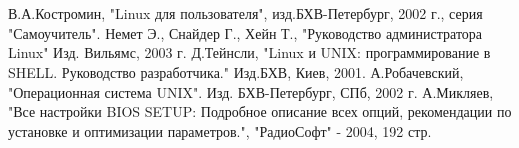 \newpage
\section*{}

\begin{thebibliography}{00}

 В.А.Костромин, "Linux для пользователя", изд.БХВ-Петербург, 2002 г., серия "Самоучитель".
 Немет Э., Снайдер Г., Хейн Т., "Руководство администратора Linux" Изд. Вильямс, 2003 г.
Д.Тейнсли, "Linux и UNIX: программирование в SHELL. Руководство разработчика." Изд.БХВ, Киев, 2001. 
А.Робачевский, "Операционная система UNIX". Изд. БХВ-Петербург, СПб, 2002 г. 
А.Микляев, "Все настройки BIOS SETUP: Подробное описание всех опций, рекомендации по установке и оптимизации параметров.", "РадиоСофт" - 2004, 192 стр. 


\end{thebibliography}